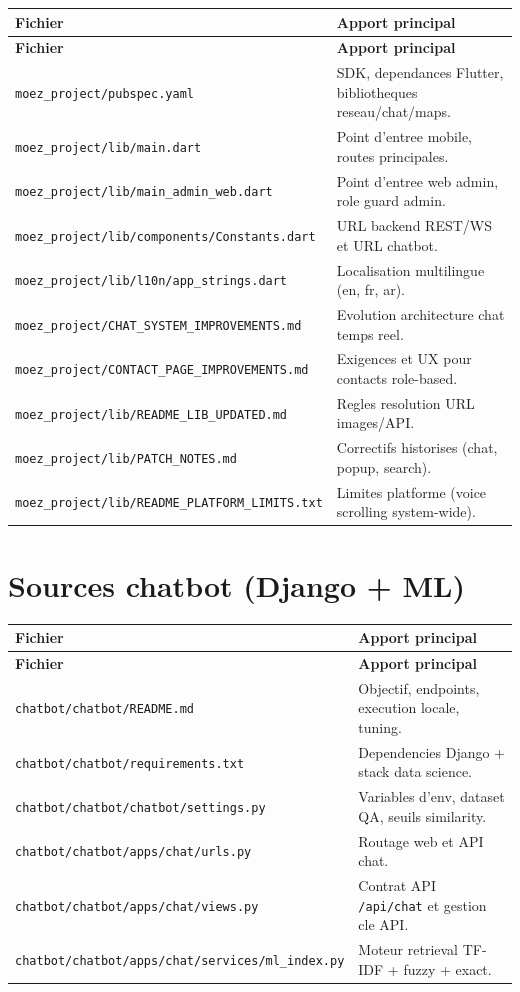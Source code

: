 \begin{longtable}{p{} p{}}
\toprule
\textbf{Fichier} & \textbf{Apport principal} \\
\midrule
\endfirsthead
\toprule
\textbf{Fichier} & \textbf{Apport principal} \\
\midrule
\endhead
\texttt{moez\_project/pubspec.yaml} & SDK, dependances Flutter, bibliotheques reseau/chat/maps. \\
\texttt{moez\_project/lib/main.dart} & Point d'entree mobile, routes principales. \\
\texttt{moez\_project/lib/main\_admin\_web.dart} & Point d'entree web admin, role guard admin. \\
\texttt{moez\_project/lib/components/Constants.dart} & URL backend REST/WS et URL chatbot. \\
\texttt{moez\_project/lib/l10n/app\_strings.dart} & Localisation multilingue (en, fr, ar). \\
\texttt{moez\_project/CHAT\_SYSTEM\_IMPROVEMENTS.md} & Evolution architecture chat temps reel. \\
\texttt{moez\_project/CONTACT\_PAGE\_IMPROVEMENTS.md} & Exigences et UX pour contacts role-based. \\
\texttt{moez\_project/lib/README\_LIB\_UPDATED.md} & Regles resolution URL images/API. \\
\texttt{moez\_project/lib/PATCH\_NOTES.md} & Correctifs historises (chat, popup, search). \\
\texttt{moez\_project/lib/README\_PLATFORM\_LIMITS.txt} & Limites platforme (voice scrolling system-wide). \\
\bottomrule
\end{longtable}

\section{Sources chatbot (Django + ML)}

\begin{longtable}{p{} p{}}
\toprule
\textbf{Fichier} & \textbf{Apport principal} \\
\midrule
\endfirsthead
\toprule
\textbf{Fichier} & \textbf{Apport principal} \\
\midrule
\endhead
\texttt{chatbot/chatbot/README.md} & Objectif, endpoints, execution locale, tuning. \\
\texttt{chatbot/chatbot/requirements.txt} & Dependencies Django + stack data science. \\
\texttt{chatbot/chatbot/chatbot/settings.py} & Variables d'env, dataset QA, seuils similarity. \\
\texttt{chatbot/chatbot/apps/chat/urls.py} & Routage web et API chat. \\
\texttt{chatbot/chatbot/apps/chat/views.py} & Contrat API \texttt{/api/chat} et gestion cle API. \\
\texttt{chatbot/chatbot/apps/chat/services/ml\_index.py} & Moteur retrieval TF-IDF + fuzzy + exact. \\
\bottomrule
\end{longtable}

